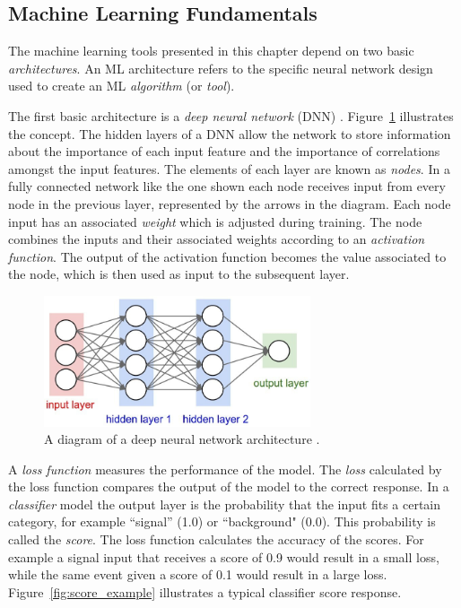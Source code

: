\subsection{Machine Learning Fundamentals}
\label{sec:ml_fund}

The machine learning tools presented in this chapter depend on two basic \textit{architectures}.
An ML architecture refers to the specific neural network design used to create an ML \textit{algorithm} (or \textit{tool}). 

The first basic architecture is a \textit{deep neural network} (DNN) \cite{dnn}.
Figure~\ref{fig:dnn} illustrates the concept.
The hidden layers of a DNN allow the network to store information about the importance of each input feature and the importance of correlations amongst the input features.
The elements of each layer are known as \textit{nodes}.
In a fully connected network like the one shown each node receives input from every node in the previous layer, represented by the arrows in the diagram.
Each node input has an associated \textit{weight} which is adjusted during training.
The node combines the inputs and their associated weights according to an \textit{activation function}.
The output of the activation function becomes the value associated to the node, which is then used as input to the subsequent layer.

\begin{figure}[!htbp]
\centering
   \includegraphics[width=0.7\textwidth]{figures/ml/dnn}
    \caption{A diagram of a deep neural network architecture \cite{dnn_pic}. 
    \label{fig:dnn}}
\end{figure}

A \textit{loss function} measures the performance of the model. 
The \textit{loss} calculated by the loss function compares the output of the model to the correct response.
In a \textit{classifier} model the output layer is the probability that the input fits a certain category, for example ``signal'' (1.0) or ``background" (0.0).
This probability is called the \textit{score}.
The loss function calculates the accuracy of the scores.
For example a signal input that receives a score of 0.9 would result in a small loss, while the same event given a score of 0.1 would result in a large loss.
Figure~\ref{fig:score_example} illustrates a typical classifier score response.

